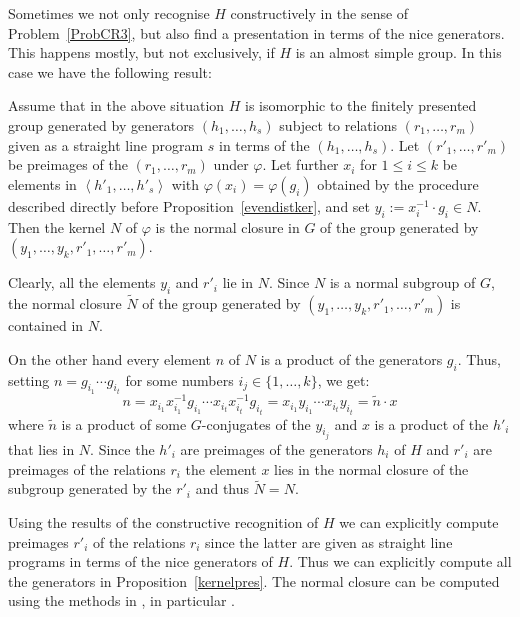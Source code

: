 \medskip
Sometimes we not only recognise $H$ constructively in the sense of
Problem~\ref{ProbCR3}, but also find a presentation in terms of the 
nice generators. This happens mostly, but not exclusively, if $H$ is an 
almost simple group. In this case we have the following result:

\begin{Prop}
\label{kernelpres}
Assume that in the above situation $H$ is isomorphic to the
finitely presented group generated by generators $(h_1, \ldots, h_s)$
subject to relations $(r_1, \ldots, r_m)$ given as a straight line
program $s$ in terms of the $(h_1, \ldots, h_s)$. Let $(r'_1, \ldots,
r'_m)$ be preimages of the $(r_1, \ldots, r_m)$ under $\varphi$. 
Let further $x_i$ for $1 \le i \le k$ be elements in $\left< h'_1, \ldots, 
h'_s \right>$ with $\varphi(x_i) = \varphi(g_i)$ obtained by the procedure 
described directly before Proposition~\ref{evendistker}, and set 
$y_i := x_i^{-1} \cdot g_i \in N$. Then the kernel $N$ of
$\varphi$ is the normal closure in $G$ of the group generated by
$(y_1, \ldots, y_k, r'_1, \ldots, r'_m)$.
\end{Prop}
\proofbeg
Clearly, all the elements $y_i$ and $r'_i$ lie in $N$. Since $N$ is a
normal subgroup of $G$, the normal closure $\tilde N$ of the group generated
by $(y_1, \ldots, y_k, r'_1, \ldots, r'_m)$ is contained in $N$.

On the other hand every element $n$ of $N$ is a product of the generators
$g_i$. Thus, setting $n = g_{i_1} \cdots g_{i_t}$ for some numbers
$i_j \in \{ 1, \ldots, k \}$, we get:
\[ n = x_{i_1} x_{i_1}^{-1} g_{i_1} \cdots x_{i_t} x_{i_t}^{-1} g_{i_t}
     = x_{i_1} y_{i_1} \cdots x_{i_t} y_{i_t}
     = \tilde n \cdot x \]
where $\tilde n$ is a product of some $G$-conjugates of the $y_{i_j}$
and $x$ is a product of the $h'_i$ that lies in $N$. Since the $h'_i$
are preimages of the generators $h_i$ of $H$ and $r'_i$ are preimages
of the relations $r_i$ the element $x$ lies in the normal closure
of the subgroup generated by the $r'_i$ and thus $\tilde N = N$.
\proofend

\begin{Rem}
Using the results of the constructive recognition of $H$ we
can explicitly compute preimages $r'_i$ of the relations $r_i$ since
the latter are given as straight line programs in terms of the nice
%
generators of $H$. Thus we can explicitly compute all the generators in
Proposition~\ref{kernelpres}. The normal closure can be computed using
the methods in \cite[Chapter 2]{Ser}, in particular
\cite[Theorem~2.3.9]{Ser}.
\end{Rem}

